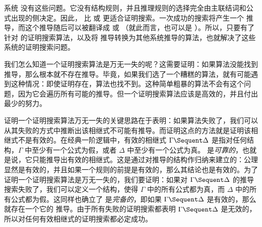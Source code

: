 \documentclass[../../../include/open-logic-section]{subfiles}
\begin{document}
系统  没有这些问题。它没有结构规则，并且推理规则的选择完全由主联结词和公式出现的侧决定。因此， 比  或  更适合证明搜索。一次成功的搜索将产生一个  推导，而这个推导随后可以被翻译成  或 （就此而言，也可以是 ）。所以，只要有了针对  的证明搜索算法，以及将  推导转换为其他系统推导的算法，也就解决了这些系统的证明搜索问题。

我们怎么知道一个证明搜索算法是万无一失的呢？这需要证明：如果算法没能找到推导，那么根本就不存在推导。毕竟，如果我们选了一个糟糕的算法，就有可能遇到这种情况：即使证明存在，算法也找不到。这种简单粗暴的算法不会有这个问题，因为它会遍历所有可能的推导。但一个证明搜索算法应该是高效的，并且付出最少的努力。

证明一个证明搜索算法万无一失的关键思路在于表明：如果算法失败了，我们可以从其失败的方式中推断出该相继式不可能有推导。而证明这点的方法就是证明该相继式不是有效的。在经典一阶逻辑中，有效的相继式 $\Gamma \Sequent \Delta$ 是指对任何结构，$\Gamma$ 中至少有一个公式为假，或者 $\Delta$ 中至少有一个公式为真。 是\emph{可靠的}，也就是说，它只能推导出有效的相继式。这是通过对推导的结构作归纳来建立的：公理显然是有效的，并且如果一个规则的前提是有效的，那么其结论也是有效的。为了证明一个证明搜索算法是万无一失的，我们要证明：如果对 $\Gamma \Sequent \Delta$ 的推导搜索失败了，我们可以定义一个结构，使得 $\Gamma$ 中的所有公式都为真，而 $\Delta$ 中的所有公式都为假。这同样也确立了  是\emph{完备的}，即如果 $\Gamma \Sequent \Delta$ 是有效的，那么就存在一个它的  推导。由于所有失败的证明搜索都表明 $\Gamma \Sequent \Delta$ 是无效的，所以对任何有效相继式的证明搜索都必定成功。
\end{document}
